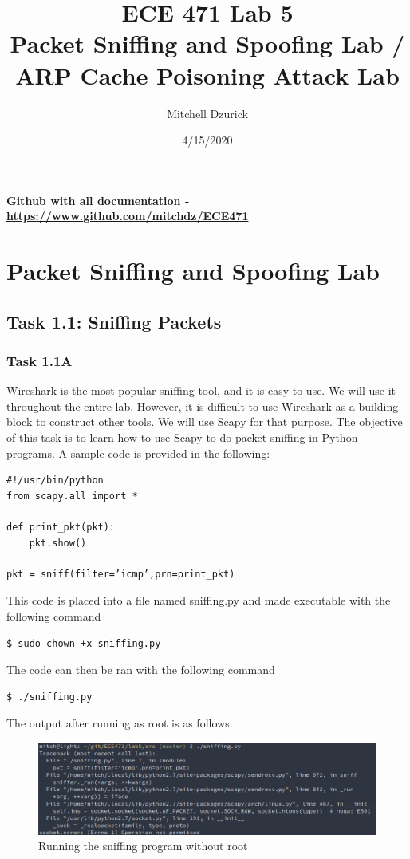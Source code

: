 \documentclass[12pt]{article}
\title {{\bf ECE 471 Lab 5} \\
\large{Packet Sniffing and Spoofing Lab / ARP Cache Poisoning Attack Lab
}}
\author{Mitchell Dzurick}
\date{4/15/2020}
\begin{document}
\maketitle
\textbf{Github with all documentation - \url{https://www.github.com/mitchdz/ECE471}}
\tableofcontents 
\clearpage



\section{Packet Sniffing and Spoofing Lab}

\subsection{Task 1.1: Sniffing Packets}
\subsubsection{Task 1.1A}
Wireshark is the most popular sniffing tool, and it is easy to use. We will use it throughout the entire lab.
However, it is difficult to use Wireshark as a building block to construct other tools. We will use Scapy
for that purpose. The objective of this task is to learn how to use Scapy to do packet sniffing in Python
programs. A sample code is provided in the following:
\begin{verbatim}
#!/usr/bin/python
from scapy.all import *

def print_pkt(pkt):
    pkt.show()

pkt = sniff(filter=’icmp’,prn=print_pkt)

\end{verbatim}

This code is placed into a file named sniffing.py and made executable with the following command

\begin{verbatim}
$ sudo chown +x sniffing.py
\end{verbatim}
The code can then be ran with the following command
\begin{verbatim}
$ ./sniffing.py
\end{verbatim}

The output after running as root is as follows:
\begin{figure}[H]
\includegraphics[scale=0.45]{images/p1t1_1.png}
\caption{Running the sniffing program without root}
\label{fig:p1t1_1}
\end{figure}
\end{document}
